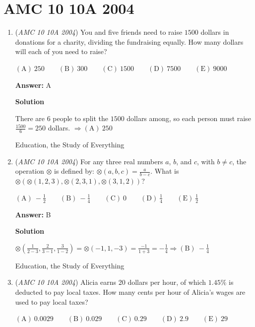 \section{AMC 10 10A 2004}
        \begin{enumerate}
        	\item (\textit{AMC 10 10A 2004}) You and five friends need to raise $1500$ dollars in donations for a charity, dividing the fundraising equally.  How many dollars will each of you need to raise?


 $\mathrm{(A) \ } 250\qquad \mathrm{(B) \ } 300 \qquad \mathrm{(C) \ } 1500 \qquad \mathrm{(D) \ } 7500 \qquad \mathrm{(E) \ } 9000$

 \textbf{Answer: }A



\textbf{Solution}

There are $6$ people to split the $1500$ dollars among, so each person must raise $\frac{1500}6=250$ dollars.  $\Rightarrow\boxed{\mathrm{(A)}\ 250}$

 Education, the Study of Everything

 


	\item (\textit{AMC 10 10A 2004}) For any three real numbers $a$, $b$, and $c$, with $b\neq c$, the operation $\otimes$ is defined by:
$\otimes(a,b,c)=\frac{a}{b-c}.$
What is $\otimes ( \otimes (1,2,3), \otimes (2,3,1), \otimes (3,1,2))$?


 $\mathrm{(A) \ } -\frac{1}{2}\qquad \mathrm{(B) \ } -\frac{1}{4} \qquad \mathrm{(C) \ } 0 \qquad \mathrm{(D) \ } \frac{1}{4} \qquad \mathrm{(E) \ } \frac{1}{2}$

 \textbf{Answer: }B



\textbf{Solution}

$\otimes \left(\frac{1}{2-3},\frac{2}{3-1},\frac{3}{1-2}\right)=\otimes(-1,1,-3)=\frac{-1}{1+3}=-\frac{1}{4}\Longrightarrow\boxed{\mathrm{(B)}\ -\frac{1}{4}}$

 


 Education, the Study of Everything

 


 


	\item (\textit{AMC 10 10A 2004}) Alicia earns 20 dollars per hour, of which $1.45\%$ is deducted to pay local taxes.  How many cents per hour of Alicia's wages are used to pay local taxes?


 $\mathrm{(A) \ } 0.0029 \qquad \mathrm{(B) \ } 0.029 \qquad \mathrm{(C) \ } 0.29 \qquad \mathrm{(D) \ } 2.9 \qquad \mathrm{(E) \ } 29$


\end{enumerate}

